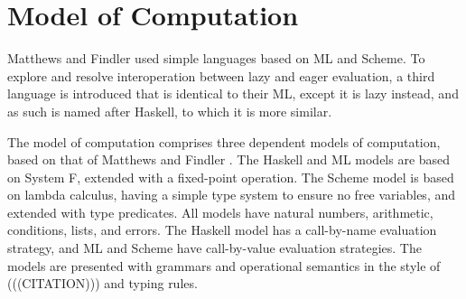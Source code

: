 \newcommand{\haskell}{Haskell model\xspace}
\newcommand{\ml}{ML model\xspace}
\newcommand{\scheme}{Scheme model\xspace}

\newcommand{\haskellml}{Haskell and ML models\xspace}
\newcommand{\haskellmlscheme}{Haskell, ML, and Scheme models\xspace}

\newcommand{\articlehaskell}[1]{#1 \haskell}
\newcommand{\articleml}[1]{#1 \ml}
\newcommand{\articlescheme}[1]{#1 \scheme}

\newcommand{\articlehaskellml}[1]{#1 \haskellml}
\newcommand{\articlehaskellmlscheme}[1]{#1 \haskellmlscheme}

\newcommand{\thehaskell}{\articlehaskell{the}}
\newcommand{\Thehaskell}{\articlehaskell{The}}
\newcommand{\theml}{\articleml{the}}
\newcommand{\Theml}{\articleml{The}}
\newcommand{\thescheme}{\articlescheme{the}}
\newcommand{\Thescheme}{\articlescheme{The}}

\newcommand{\thehaskellml}{\articlehaskellml{the}}
\newcommand{\Thehaskellml}{\articlehaskellml{The}}
\newcommand{\thehaskellmlscheme}{\articlehaskellmlscheme{the}}
\newcommand{\Thehaskellmlscheme}{\articlehaskellmlscheme{The}}

\newcommand{\hastype}[1]{has the type #1}
\newcommand{\havetype}[1]{have the type #1}

\section{Model of Computation}

Matthews and Findler used simple languages based on ML and Scheme. To explore and resolve interoperation between lazy and eager evaluation, a third language is introduced that is identical to their ML, except it is lazy instead, and as such is named after Haskell, to which it is more similar.

The model of computation comprises three dependent models of computation, based on that of Matthews and Findler \cite{matthews07}. The Haskell and ML models are based on System F, extended with a fixed-point operation. The Scheme model is based on lambda calculus, having a simple type system to ensure no free variables, and extended with type predicates. All models have natural numbers, arithmetic, conditions, lists, and errors. The Haskell model has a call-by-name evaluation strategy, and ML and Scheme have call-by-value evaluation strategies. The models are presented with grammars and operational semantics in the style of (((CITATION))) and typing rules.

